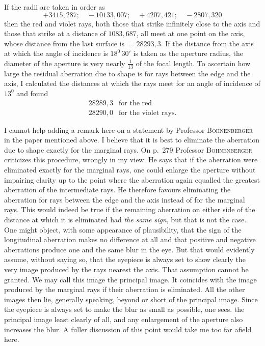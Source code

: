 If the radii are taken in order as
\[
+3415{,}287;\quad -10133{,}007;\quad +4207{,}421;\quad -2807{,}320
\]
then the red and violet rays, both those that strike infinitely close to the axis and those that strike at a distance of $1083{,}687$, all meet at one point on the axis, whose distance from the last surface is $=28293{,}3$. If the distance from the axis at which the angle of incidence is $18^0\,30'$ is taken as the aperture radius, the diameter of the aperture is very nearly $\tfrac{1}{13}$ of the focal length. To ascertain how large the residual aberration due to shape is for rays between the edge and the axis, I calculated the distances at which the rays meet for an angle of incidence of $13^0$ and found
\[
\begin{array}{ll}
28289{,}3&\text{for the red}\\
28290{,}0&\text{for the violet rays.}
\end{array}
\]

I cannot help adding a remark here on a statement by Professor \textsc{Bohnenberger} in the paper mentioned above. I believe that it is best to eliminate the aberration due to shape exactly for the marginal rays. On p.\ 279 Professor \textsc{Bohnenberger} criticizes this procedure, wrongly in my view. He says that if the aberration were eliminated exactly for the marginal rays, one could enlarge the aperture without impairing clarity up to the point where the aberration again equalled the greatest aberration of the intermediate rays. He therefore favours eliminating the aberration for rays between the edge and the axis instead of for the marginal rays. This would indeed be true if the remaining aberration on either side of the distance at which it is eliminated had \textit{the same sign}, but that is not the case. One might object, with some appearance of plausibility, that the sign of the longitudinal aberration makes no difference at all and that positive and negative aberrations produce one and the same blur in the eye. But that would evidently assume, without saying so, that the eyepiece is always set to show clearly the very image produced by the rays nearest the axis. That assumption cannot be granted. We may call this image the principal image. It coincides with the image produced by the marginal rays if their aberration is eliminated. All the other images then lie, generally speaking, beyond or short of the principal image. Since the eyepiece is always set to make the blur as small as possible, one sees. the principal image least clearly of all, and any enlargement of the aperture also increases the blur. A fuller discussion of this point would take me too far afield here.
